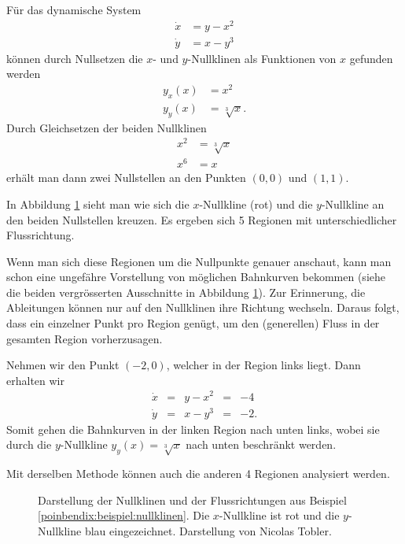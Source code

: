 \begin{beispiel} \label{poinbendix:beispiel:nullklinen}

Für das dynamische System
\begin{align*}
    \dot{x} &= y - x^2 \\
    \dot{y} &= x - y^3
\end{align*}
können durch Nullsetzen die $x$- und $y$-Nullklinen als Funktionen von $x$ gefunden werden
\begin{align*}
    y_x(x) &= x^2 \\
    y_y(x) &= \sqrt[3]{x}.
\end{align*}
Durch Gleichsetzen der beiden Nullklinen
\begin{align*}
    x^2 &= \sqrt[3]{x} \\
    x^6 &= x
\end{align*}
erhält man dann zwei Nullstellen an den Punkten $(0, 0)$ und $(1, 1)$.

In Abbildung \ref{poinbendix:fig:nullklinen} sieht man wie sich die $x$-Nullkline (rot) und die $y$-Nullkline an den beiden Nullstellen kreuzen.
Es ergeben sich 5 Regionen mit unterschiedlicher Flussrichtung.

Wenn man sich diese Regionen um die Nullpunkte genauer anschaut, kann man schon eine ungefähre Vorstellung von möglichen Bahnkurven bekommen (siehe die beiden vergrösserten Ausschnitte in Abbildung \ref{poinbendix:fig:nullklinen}).
Zur Erinnerung, die Ableitungen können nur auf den Nullklinen ihre Richtung wechseln.
Daraus folgt, dass ein einzelner Punkt pro Region genügt, um den (generellen) Fluss in der gesamten Region vorherzusagen.

Nehmen wir den Punkt $(-2, 0)$, welcher in der Region links liegt.
Dann erhalten wir
\[
\begin{array}{rcccl}
\dot{x} &=& y-x^2 &=&-4 \\
\dot{y} &=& x-y^3 &=&-2.
\end{array}
\]
Somit gehen die Bahnkurven in der linken Region nach unten links, wobei sie durch die $y$-Nullkline $y_y(x) = \sqrt[3]{x}$ nach unten beschränkt werden.

Mit derselben Methode können auch die anderen 4 Regionen analysiert werden.
\end{beispiel}

\begin{figure}
    \centering
    
    \caption{Darstellung der Nullklinen und der Flussrichtungen aus Beispiel \ref{poinbendix:beispiel:nullklinen}. Die $x$-Nullkline ist rot und die $y$-Nullkline blau eingezeichnet. Darstellung von Nicolas Tobler.}
    \label{poinbendix:fig:nullklinen}
\end{figure}

